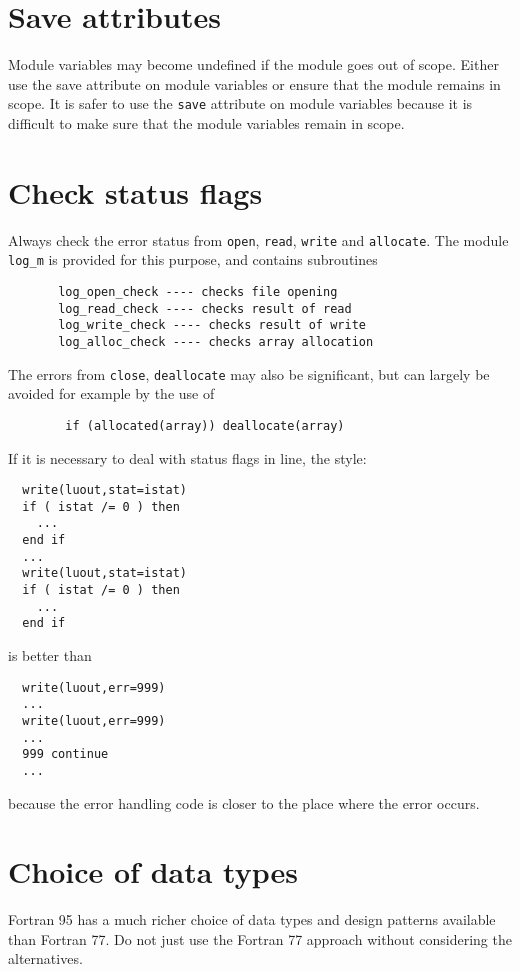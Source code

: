 \documentclass[11pt,twoside,a4paper]{report}
\newcommand{\T}[1]{{\tt #1}}
\begin{document}
\section{Save attributes}

Module variables may become undefined if the module goes out of
scope. Either use the save attribute on module variables or ensure that
the module remains in scope. It is safer to use the \verb|save|
attribute on module variables because it is difficult to make sure
that the module variables remain in scope.


\section{Check status flags}

Always check the error status from \verb|open|,
\verb|read|, \verb|write| and \verb|allocate|.
The module \T{log\_m} is provided for this purpose, and contains
subroutines
\begin{verbatim}
       log_open_check ---- checks file opening
       log_read_check ---- checks result of read
       log_write_check ---- checks result of write
       log_alloc_check ---- checks array allocation
\end{verbatim}
The errors from \verb|close|, \verb|deallocate| may also be
significant, but can largely be avoided for example by the use of 
\begin{verbatim}
        if (allocated(array)) deallocate(array)
\end{verbatim}


If it is necessary to deal with status flags in line, the style:
\begin{verbatim}
  write(luout,stat=istat)
  if ( istat /= 0 ) then
    ...
  end if
  ...
  write(luout,stat=istat)
  if ( istat /= 0 ) then
    ...
  end if
\end{verbatim}
is better than
\begin{verbatim}
  write(luout,err=999)
  ...
  write(luout,err=999)
  ...
  999 continue
  ...
\end{verbatim}
because the error handling code is closer to the place where the error
occurs. 



\section{Choice of data types}

Fortran 95 has a much richer choice of data types and design patterns
available than Fortran 77. Do not just use the Fortran 77 approach without
considering the alternatives.
\end{document}
